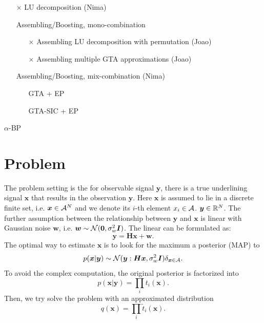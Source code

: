 \documentclass{article}
\begin{document}
\begin{itemize}
\item[$\times$] LU decomposition (Nima)
\item[\checkmark] Assembling/Boosting, mono-combination
  \begin{itemize}
  \item[$\times$] Assembling LU decomposition with permutation (Joao)
  \item[$\times$] Assembling multiple GTA approximations (Joao)
  
    
  \end{itemize}
\item[\checkmark] Assembling/Boosting, mix-combination (Nima)
  \begin{itemize}
  \item[\checkmark] GTA + EP
  \item[\checkmark] GTA-SIC + EP
  \end{itemize}

\end{itemize}

$\alpha$-BP
\section{Problem}\label{sec:problem}
The problem setting is the for observable signal $\bm{y}$, there is a true underlining signal $\bm{x}$ that results in the observation $\bm{y}$. Here $\bm{x}$ is assumed to lie in a discrete finite set, i.e. $\bm{x} \in {\mathcal{A}}^{N}$ and we denote its $i$-th element $x_i \in \mathcal{A}$. $\bm{y}\in \mathbb{R}^N$. The further assumption between the relationship between $\bm{y}$ and $\bm{x}$ is linear with Gaussian noise $\bm{w}$, i.e. $\bm{w}\sim \mathcal{N}(\bm{0}, \sigma_{w}^2 \bm{I})$. The linear can be formulated as:
\begin{equation}\label{eq:linear-model}
  \bm{y} = \bm{H} \bm{x} + \bm{w}.
\end{equation}
The optimal way to estimate $\bm{x}$ is to look for the maximum a posterior (MAP) to
\begin{equation}
  p(\bm{x}|\bm{y}) \sim \mathcal{N}(\bm{y}: \bm{H}\bm{x}, \sigma_{w}^2\bm{I})\delta_{\bm{x}\in \mathcal{A}}.
\end{equation}
To avoid the complex computation, the original posterior is factorized into
\begin{equation}
  p(\bm{x}|\bm{y}) = \prod_i t_i(\bm{x}).
\end{equation}
Then, we try solve the problem with an approximated distribution 
\begin{equation}\label{eq:apx-dist-q}
  q(\bm{x}) = \prod_i \tilde{t}_i(\bm{x}).
\end{equation}
\end{document}
